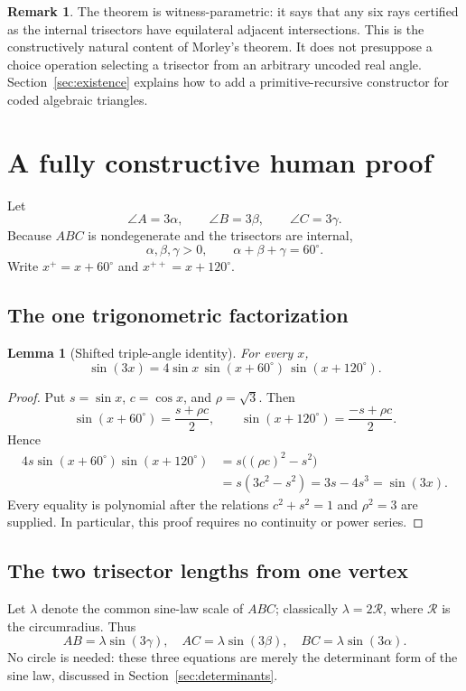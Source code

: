 \documentclass[11pt]{article}
\newtheorem{lemma}[theorem]{Lemma}
\theoremstyle{definition}
\newtheorem{remark}[theorem]{Remark}
\begin{document}
\begin{remark}
The theorem is witness-parametric: it says that any six rays certified as the
internal trisectors have equilateral adjacent intersections.  This is the
constructively natural content of Morley's theorem.  It does not presuppose a
choice operation selecting a trisector from an arbitrary uncoded real angle.
Section~\ref{sec:existence} explains how to add a primitive-recursive
constructor for coded algebraic triangles.
\end{remark}

\section{A fully constructive human proof}
\label{sec:human-proof}

Let
\[
  \angle A=3\alpha,\qquad
  \angle B=3\beta,\qquad
  \angle C=3\gamma.
\]
Because $ABC$ is nondegenerate and the trisectors are internal,
\[
  \alpha,\beta,\gamma>0,
  \qquad \alpha+\beta+\gamma=60^\circ.
  \tag{2.1}\label{eq:sum}
\]
Write $x^+=x+60^\circ$ and $x^{++}=x+120^\circ$.

\subsection{The one trigonometric factorization}

\begin{lemma}[Shifted triple-angle identity]
\label{lem:triple}
For every $x$,
\[
  \sin(3x)=4\sin x\,\sin(x+60^\circ)\,\sin(x+120^\circ).
  \tag{2.2}\label{eq:triple}
\]
\end{lemma}

\begin{proof}
Put $s=\sin x$, $c=\cos x$, and $\rho=\sqrt3$.  Then
\[
 \sin(x+60^\circ)=\frac{s+\rho c}{2},\qquad
 \sin(x+120^\circ)=\frac{-s+\rho c}{2}.
\]
Hence
\begin{align*}
4s\sin(x+60^\circ)\sin(x+120^\circ)
 &=s\bigl((\rho c)^2-s^2\bigr)\\
 &=s(3c^2-s^2)
 =3s-4s^3
 =\sin(3x).
\end{align*}
Every equality is polynomial after the relations $c^2+s^2=1$ and
$\rho^2=3$ are supplied.  In particular, this proof requires no continuity or
power series.
\end{proof}

\subsection{The two trisector lengths from one vertex}
Let $\lambda$ denote the common sine-law scale of $ABC$; classically
$\lambda=2\mathcal R$, where $\mathcal R$ is the circumradius.  Thus
\[
 AB=\lambda\sin(3\gamma),\quad
 AC=\lambda\sin(3\beta),\quad
 BC=\lambda\sin(3\alpha).
 \tag{2.3}\label{eq:sides}
\]
No circle is needed: these three equations are merely the determinant form of
the sine law, discussed in Section~\ref{sec:determinants}.
\end{document}
